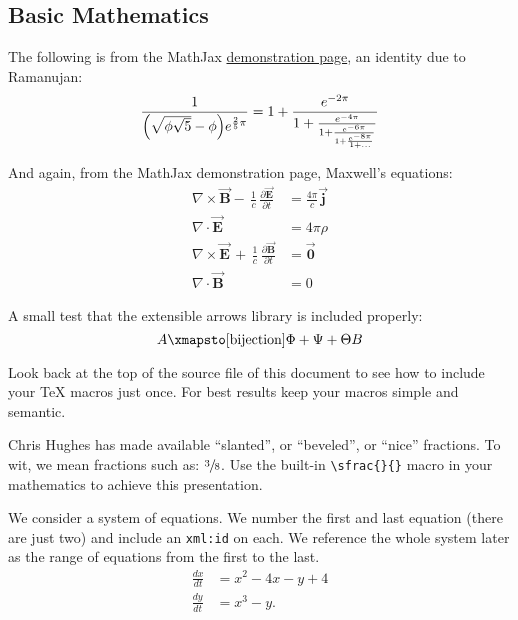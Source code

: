 \documentclass[10pt,]{article}
\theoremstyle{plain}
\theoremstyle{definition}
\theoremstyle{definition}
\theoremstyle{definition}
\theoremstyle{definition}
\theoremstyle{definition}
\theoremstyle{definition}
\numberwithin{equation}{section}
\newcommand{\amp}{&}
\begin{document}
\subsection[{Basic Mathematics}]{Basic Mathematics}\label{subsection-8}
\hypertarget{p-174}{}%
The following is from the MathJax \href{http://www.mathjax.org/demos/tex-samples/}{demonstration page}, an identity due to Ramanujan:%
\begin{equation*}
\frac{1}{\Bigl(\sqrt{\phi \sqrt{5}}-\phi\Bigr) e^{\frac25 \pi}} = 1+\frac{e^{-2\pi}} {1+\frac{e^{-4\pi}} {1+\frac{e^{-6\pi}} {1+\frac{e^{-8\pi}} {1+\ldots} } } }
\end{equation*}
%
\par
\hypertarget{p-175}{}%
And again, from the MathJax demonstration page, Maxwell's equations:%
\begin{align*}
\nabla \times \vec{\mathbf{B}} -\, \frac1c\, \frac{\partial\vec{\mathbf{E}}}{\partial t} & = \frac{4\pi}{c}\vec{\mathbf{j}}\\
\nabla \cdot \vec{\mathbf{E}} & = 4 \pi \rho\\
\nabla \times \vec{\mathbf{E}}\, +\, \frac1c\, \frac{\partial\vec{\mathbf{B}}}{\partial t} & = \vec{\mathbf{0}}\\
\nabla \cdot \vec{\mathbf{B}} & = 0
\end{align*}
\label{notation-4}
%
\par
\hypertarget{p-176}{}%
A small test that the extensible arrows library is included properly:%
\begin{equation*}
A\xmapsto[\text{bijection}]{\Phi+\Psi+\Theta}B
\end{equation*}
%
\par
\hypertarget{p-177}{}%
Look back at the top of the source file of this document to see how to include your \TeX{} macros just once.  For best results keep your macros simple and semantic.%
\par
\hypertarget{p-178}{}%
Chris Hughes has made available ``slanted'', or ``beveled'', or ``nice'' fractions.  To wit, we mean fractions such as: \(\sfrac{3}{8}\).  Use the built-in \lstinline?\sfrac{}{}? macro in your mathematics to achieve this presentation.%
\par
\hypertarget{p-179}{}%
We consider a system of equations.  We number the first and last equation (there are just two) and include an \lstinline?xml:id? on each.  We reference the whole system later as the range of equations from the first to the last.%
\begin{align}
\frac{dx}{dt} \amp = x^2 - 4x - y + 4\label{equation-system-begin}\\
\frac{dy}{dt} \amp = x^3 - y.\label{equation-system-end}
\end{align}
%
\typeout{************************************************}
\typeout{************************************************}
\end{document}

